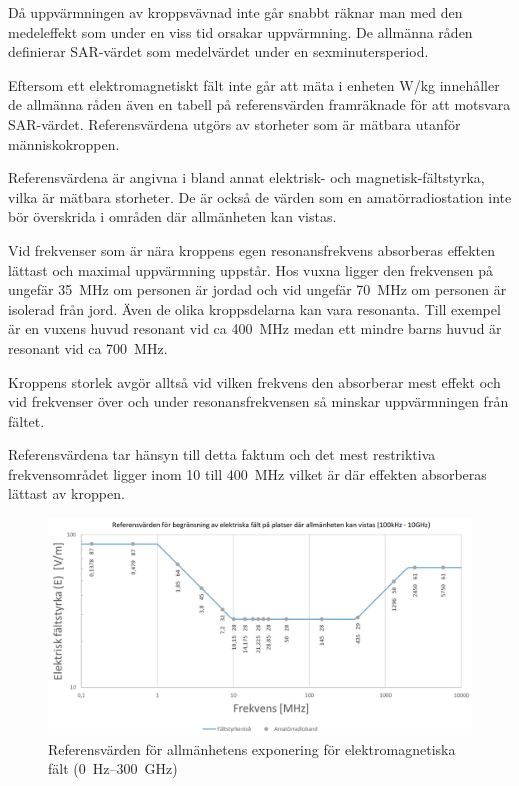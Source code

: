 Då uppvärmningen av kroppsvävnad inte går snabbt räknar man med den
medeleffekt som under en viss tid orsakar uppvärmning.
De allmänna råden definierar SAR-värdet som medelvärdet under en
sexminutersperiod.

Eftersom ett elektromagnetiskt fält inte går att mäta i enheten W/kg
innehåller de allmänna råden även en tabell på referensvärden
framräknade för att motsvara SAR-värdet.
Referensvärdena utgörs av storheter som är mätbara utanför människokroppen.

Referensvärdena är angivna i bland annat elektrisk- och
magnetisk-fältstyrka, vilka är mätbara storheter.
De är också de värden som en amatörradiostation inte bör överskrida i områden
där allmänheten kan vistas.

Vid frekvenser som är nära kroppens egen resonansfrekvens absorberas
effekten lättast och maximal uppvärmning uppstår.
Hos vuxna ligger den frekvensen på ungefär 35~MHz om personen är jordad och vid
ungefär 70~MHz om personen är isolerad från jord.
Även de olika kroppsdelarna kan vara resonanta.
Till exempel är en vuxens huvud resonant vid ca 400~MHz medan ett mindre barns huvud
är resonant vid ca 700~MHz.

Kroppens storlek avgör alltså vid vilken frekvens den absorberar mest effekt och
vid frekvenser över och under resonansfrekvensen så minskar uppvärmningen från
fältet.

Referensvärdena tar hänsyn till detta faktum och det mest restriktiva
frekvensområdet ligger inom 10 till 400~MHz vilket är där effekten
absorberas lättast av kroppen.

\begin{figure}[ht]
\begin{center}
\includegraphics[width=14cm]{images/emfbild-000}
\caption{Referensvärden för allmänhetens exponering för elektromagnetiska fält (0~Hz--300~GHz)}
\label{fig:emf1}
\end{center}
\end{figure}

